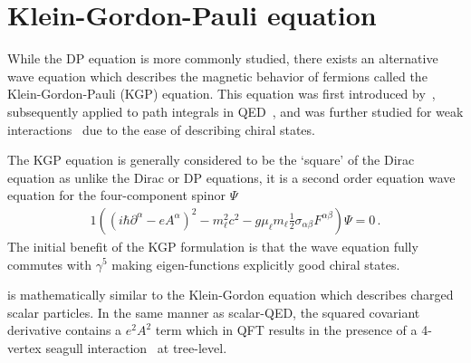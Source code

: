 \section{Klein-Gordon-Pauli equation}
\label{sec:kgp}
\noindent While the DP equation is more commonly studied, there exists an alternative wave equation which describes the magnetic behavior of fermions called the Klein-Gordon-Pauli (KGP) equation. This equation was first introduced by~\cite{Fock:1937dy}, subsequently applied to path integrals in QED~\citep{Feynman:1951gn}, and was further studied for weak interactions~\citep{Feynman:1958ty} due to the ease of describing chiral states.

The KGP equation is generally considered to be the `square' of the Dirac equation as unlike the Dirac or DP equations, it is a second order equation wave equation for the four-component spinor $\Psi$
\begin{alignat}{1}
	\label{kgp:1} \left((i\hbar\partial^{\alpha}-eA^{\alpha})^{2}-m_{\ell}^{2}c^{2}-g\mu_{\ell}m_{\ell}\frac{1}{2}\sigma_{\alpha\beta}F^{\alpha\beta}\right)\Psi=0\,.
\end{alignat}
The initial benefit of the KGP formulation is that the wave equation fully commutes with $\gamma^{5}$ making eigen-functions explicitly good chiral states.

 is mathematically similar to the Klein-Gordon equation which describes charged scalar particles. In the same manner as scalar-QED, the squared covariant derivative contains a $e^{2}A^{2}$ term which in QFT results in the presence of a 4-vertex seagull interaction~\citep{Schwartz:2014sze} at tree-level.

